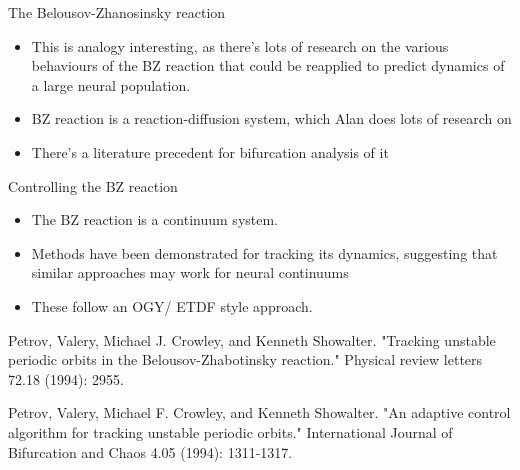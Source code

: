 \documentclass[presentation]{beamer}
\begin{document}
\begin{frame}[label={sec:orgde028da}]{The Belousov-Zhanosinsky reaction}
\begin{itemize}
\item This is analogy interesting, as there's lots of research on the various behaviours of the BZ reaction that could be reapplied to predict dynamics of a large neural population.
\item BZ reaction is a reaction-diffusion system, which Alan does lots of research on
\item There's a literature precedent for bifurcation analysis of it
\end{itemize}
\end{frame}

\begin{frame}[label={sec:org87c7c09}]{Controlling the BZ reaction}
\begin{itemize}
\item The BZ reaction is a continuum system.
\item Methods have been demonstrated for tracking its dynamics, suggesting that similar approaches may work for neural continuums
\item These follow an OGY/ ETDF style approach.
\end{itemize}

Petrov, Valery, Michael J. Crowley, and Kenneth Showalter. "Tracking unstable periodic orbits in the Belousov-Zhabotinsky reaction." Physical review letters 72.18 (1994): 2955.

Petrov, Valery, Michael F. Crowley, and Kenneth Showalter. "An adaptive control algorithm for tracking unstable periodic orbits." International Journal of Bifurcation and Chaos 4.05 (1994): 1311-1317.
\end{frame}
\end{document}
